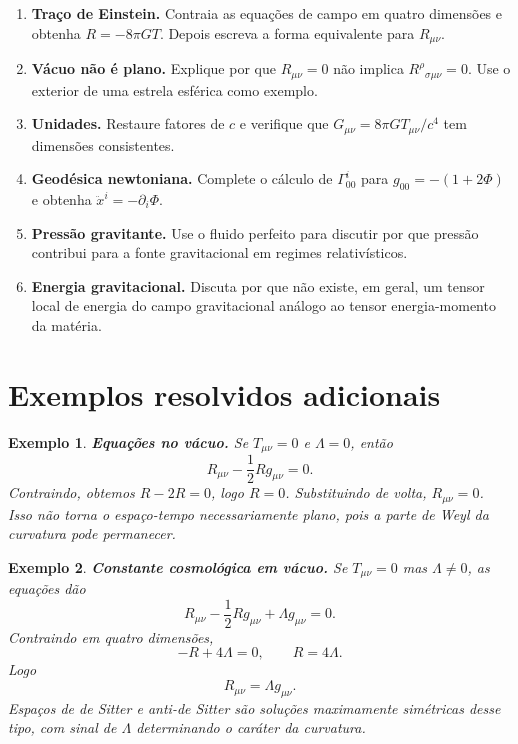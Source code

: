 \documentclass[12pt,a4paper,oneside]{book}
\theoremstyle{rgplain}
\newtheorem{example}{Exemplo}[chapter]
\theoremstyle{rgremark}
\begin{document}
\begin{enumerate}
  \item \textbf{Traço de Einstein.} Contraia as equações de campo em quatro
  dimensões e obtenha $R=-8\pi G T$. Depois escreva a forma equivalente para
  $R_{\mu\nu}$.

  \item \textbf{Vácuo não é plano.} Explique por que $R_{\mu\nu}=0$ não implica
  $R^\rho{}_{\sigma\mu\nu}=0$. Use o exterior de uma estrela esférica como
  exemplo.

  \item \textbf{Unidades.} Restaure fatores de $c$ e verifique que
  $G_{\mu\nu}=8\pi G T_{\mu\nu}/c^4$ tem dimensões consistentes.

  \item \textbf{Geodésica newtoniana.} Complete o cálculo de
  $\Gamma^i_{00}$ para $g_{00}=-(1+2\Phi)$ e obtenha
  $\ddot x^i=-\partial_i\Phi$.

  \item \textbf{Pressão gravitante.} Use o fluido perfeito para discutir por
  que pressão contribui para a fonte gravitacional em regimes relativísticos.

  \item \textbf{Energia gravitacional.} Discuta por que não existe, em geral,
  um tensor local de energia do campo gravitacional análogo ao tensor
  energia-momento da matéria.
\end{enumerate}

\section{Exemplos resolvidos adicionais}

\begin{example}
\textbf{Equações no vácuo.} Se $T_{\mu\nu}=0$ e $\Lambda=0$, então
\[
  R_{\mu\nu}-\frac12Rg_{\mu\nu}=0.
\]
Contraindo, obtemos $R-2R=0$, logo $R=0$. Substituindo de volta,
$R_{\mu\nu}=0$. Isso não torna o espaço-tempo necessariamente plano, pois a
parte de Weyl da curvatura pode permanecer.
\end{example}

\begin{example}
\textbf{Constante cosmológica em vácuo.} Se $T_{\mu\nu}=0$ mas
$\Lambda\ne0$, as equações dão
\[
  R_{\mu\nu}-\frac12Rg_{\mu\nu}+\Lambda g_{\mu\nu}=0.
\]
Contraindo em quatro dimensões,
\[
  -R+4\Lambda=0,\qquad R=4\Lambda.
\]
Logo
\[
  R_{\mu\nu}=\Lambda g_{\mu\nu}.
\]
Espaços de de Sitter e anti-de Sitter são soluções maximamente simétricas
desse tipo, com sinal de $\Lambda$ determinando o caráter da curvatura.
\end{example}
\end{document}
